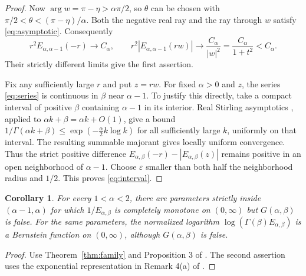 \documentclass[11pt]{article}
\newtheorem{corollary}[theorem]{Corollary}
\begin{document}
\begin{proof}
Now $\arg w=\pi-\eta>\alpha\pi/2$, so $\theta$ can be
chosen with $\pi/2<\theta<(\pi-\eta)/\alpha$.
Both the negative real ray and the ray through $w$ satisfy
\eqref{eq:asymptotic}. Consequently
\[
 r^2 E_{\alpha,\alpha-1}(-r)\longrightarrow C_\alpha,
 \qquad
 r^2|E_{\alpha,\alpha-1}(rw)|
 \longrightarrow\frac{C_\alpha}{|w|^2}
 =\frac{C_\alpha}{1+t^2}<C_\alpha.
\]
Their strictly different limits give the first assertion.

Fix any sufficiently large $r$ and put $z=rw$.
For fixed $\alpha>0$ and $z$, the series \eqref{eq:series} is
continuous in $\beta$ near $\alpha-1$.
To justify this directly, take a compact interval of positive $\beta$
containing $\alpha-1$ in its interior. Real Stirling asymptotics
\cite[Eq.~5.11.3]{stirling}, applied to $\alpha k+\beta=\alpha k+O(1)$,
give a bound
$1/\Gamma(\alpha k+\beta)\le\exp(-\tfrac\alpha2 k\log k)$
for all sufficiently large $k$, uniformly on that interval.
The resulting summable majorant gives locally uniform convergence.
Thus the strict positive difference
$E_{\alpha,\beta}(-r)-|E_{\alpha,\beta}(z)|$ remains positive
in an open neighborhood of $\alpha-1$.
Choose $\varepsilon$ smaller than both half the neighborhood radius
and $1/2$. This proves \eqref{eq:interval}.
\end{proof}

\begin{corollary}\label{cor:cm}
For every $1<\alpha<2$, there are parameters strictly inside
$(\alpha-1,\alpha)$ for which $1/E_{\alpha,\beta}$ is completely
monotone on $(0,\infty)$ but $G(\alpha,\beta)$ is false.
For the same parameters, the normalized logarithm
$\log(\Gamma(\beta)E_{\alpha,\beta})$ is a Bernstein function
on $(0,\infty)$, although $G(\alpha,\beta)$ is false.
\end{corollary}
\begin{proof}
Use Theorem~\ref{thm:family} and Proposition 3 of \cite{ggps}.
The second assertion uses the exponential representation in
Remark 4(a) of \cite{ggps}.
\end{proof}
\end{document}
